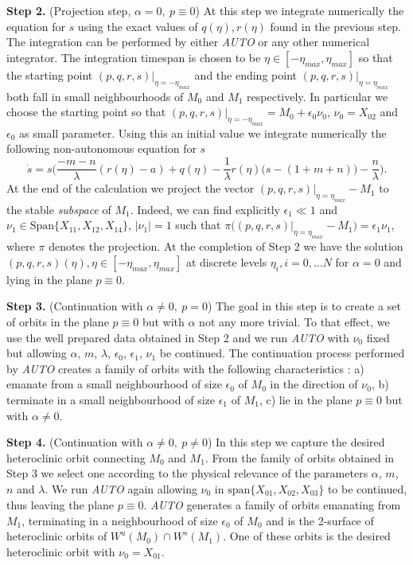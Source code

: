 \documentclass[11pt]{article}
\theoremstyle{remark}
\begin{document}
{\bf Step 2.} (Projection step, $\alpha=0, \ p\equiv 0$) At this step we integrate numerically the equation for $s$ using the  exact values of $q(\eta), r(\eta)$ found in the previous step. The integration can be performed by either \emph{AUTO} or any other numerical integrator. The integration timespan is chosen to be $\eta\in[-\eta_{max},\eta_{max}]$ so that
the starting point $(p,q,r,s)|_{\eta=-\eta_{max}}$ and the ending point $(p,q,r,s)|_{\eta=\eta_{max}}$ both fall in small neighbourhoods of $M_0$ and $M_1$ respectively. In particular we choose the starting point so that $(p,q,r,s)|_{\eta=-\eta_{max}}=M_0 + \epsilon_0 \nu_0$, $\nu_0 = X_{02}$ and $\epsilon_0$ as small parameter. Using this an initial value we integrate numerically
the following non-autonomous equation for $s$
$$
\dot{s} =s\Big(\frac{-m-n}{\lambda}(r(\eta)-a) + q(\eta) - \frac{1}{\lambda}r(\eta)\big(s- (1+m+n)\big) - \frac{n}{\lambda}\Big).
$$
At the end of the calculation we project the vector $(p,q,r,s)|_{\eta=\eta_{max}}- M_1$ to the stable {\it subspace} of $M_1$.  Indeed,  we can find explicitly $\epsilon_1\ll 1$ and $\nu_1 \in \underset{}{ \textrm{Span}}\{X_{11},X_{12},X_{14}\}$, $|\nu_1|=1$ such that
$\pi\big((p,q,r,s)|_{\eta=\eta_{max}}- M_1\big) =\epsilon_1 \nu_1$, where $\pi$ denotes the projection.
At the completion of Step 2 we have the solution $(p,q,r,s)(\eta), \eta\in[-\eta_{max},\eta_{max}]$ at discrete levels $\eta_i, i=0,\dots N$ for $\alpha=0$ and lying in the plane $p\equiv 0$.

{\bf Step 3.} (Continuation with $\alpha\neq 0, \ p=0$) The goal in this step is to create a set of orbits in the plane $p\equiv 0$ but with $\alpha$ not any more trivial. To that effect, we use the well prepared data obtained in Step 2 and we run \emph{AUTO} with $\nu_0$ fixed but allowing $\alpha$, $m$, $\lambda$, $\epsilon_0$, $\epsilon_1$, $\nu_1$ be continued. The continuation process performed by \emph{AUTO} creates a family of orbits with the following characteristics : a) emanate from a small neighbourhood of size $\epsilon_0$ of $M_0$ in the direction of  $\nu_0$, b) terminate in a small neighbourhood of size $\epsilon_1$ of $M_1$, c) lie in the plane $p\equiv 0$ but with $\alpha\neq 0$.




{\bf Step 4.} (Continuation with $\alpha\neq 0, \ p\neq 0$) In this step we capture the desired heteroclinic orbit connecting $M_0$ and $M_1$. From the family of orbits obtained in Step 3 we select one according to the physical relevance of the parameters $\alpha$, $m$, $n$ and $\lambda$. We run \emph{AUTO} again allowing  $\nu_0$ in $\underset{}{ \textrm{span}}\{X_{01},X_{02},X_{03}\}$ to be continued, thus leaving the plane $p\equiv 0$. \emph{AUTO} generates a family of orbits emanating from $M_1$, terminating in a neighbourhood of size $\epsilon_0$ of $M_0$ and is the 2-surface of heteroclinic orbits of $W^u(M_0)\cap W^s(M_1)$. One of these orbits is the desired heteroclinic orbit  with $\nu_0=X_{01}$.
\end{document}
